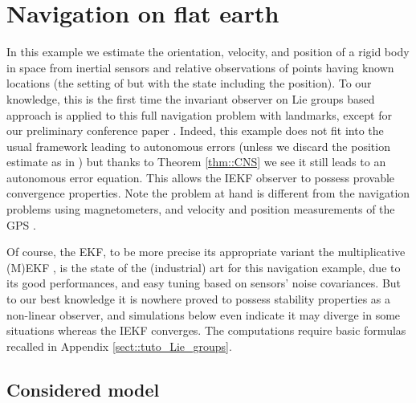 \documentclass[a4paper,12pt,onecolumn]{article}
\begin{document}
\section{Navigation on flat earth}\label{sect::examples:B}

In this example we estimate the orientation, velocity, and position of a rigid body in space from inertial sensors and relative observations of points having known locations (the setting of \cite{Vasconcelos} but with the state including the position). To our knowledge, this is the first time the invariant observer on Lie groups based approach  is applied to this full navigation problem with landmarks, except for our preliminary conference paper \cite{barrau-bonnabel-cdc14}. Indeed, this example does not fit into the usual framework leading to autonomous errors (unless we discard the position estimate as in   \cite{Vasconcelos}) but thanks to Theorem \ref{thm::CNS} we see it still leads to an autonomous error equation. This allows the IEKF observer to possess provable convergence properties. Note  the problem at hand is different from the navigation problems using magnetometers, and velocity and position measurements of the GPS  \cite{hua2010attitude,grip2015globally}. 

Of course, the EKF, to be more precise its appropriate variant the multiplicative (M)EKF \cite{lefferts1982kalman}, is the state of the (industrial) art for this navigation example, due to its good  performances, and easy tuning based on sensors' noise covariances. But to our best knowledge it is nowhere proved to possess stability properties as a non-linear observer, and  simulations below even indicate  it may diverge in some situations whereas the IEKF converges. The computations require basic formulas recalled in Appendix \ref{sect::tuto_Lie_groups}. 

\subsection{Considered  model}
\end{document}
